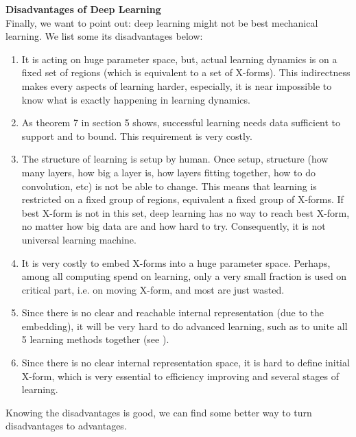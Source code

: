{\bf Disadvantages of Deep Learning} \\
Finally, we want to point out: deep learning might not be best mechanical learning. We list some its disadvantages below: 
\begin{enumerate} [topsep=0pt,itemsep=-1ex,partopsep=1ex,parsep=1ex]
\item It is acting on huge parameter space, but, actual learning dynamics is on a fixed set of regions (which is equivalent to a set of X-forms). This indirectness makes every aspects of learning harder, especially, it is near impossible to know what is exactly happening in learning dynamics.
\item As theorem 7 in section 5 shows, successful learning needs data sufficient to support and to bound. This requirement is very costly.
\item The structure of learning is setup by human. Once setup, structure (how many layers, how big a layer is, how layers fitting together, how to do convolution, etc) is not be able to change. This means that learning is restricted on a fixed group of regions, equivalent a fixed group of X-forms. If best X-form is not in this set, deep learning has no way to reach best X-form, no matter how big data are and how hard to try. Consequently, it is not universal learning machine.
\item It is very costly to embed X-forms into a huge parameter space. Perhaps, among all computing spend on learning, only a very small fraction is used on critical part, i.e. on moving X-form, and most are just wasted.
\item Since there is no clear and reachable internal representation (due to the embedding), it will be very hard to do advanced learning, such as to unite all 5 learning methods together (see \cite{pedro}).
\item Since there is no clear internal representation space, it is hard to define initial X-form, which is very essential to efficiency improving and several stages of learning.
\end{enumerate}
Knowing the disadvantages is good, we can find some better way to turn disadvantages to advantages. 
\bigskip


